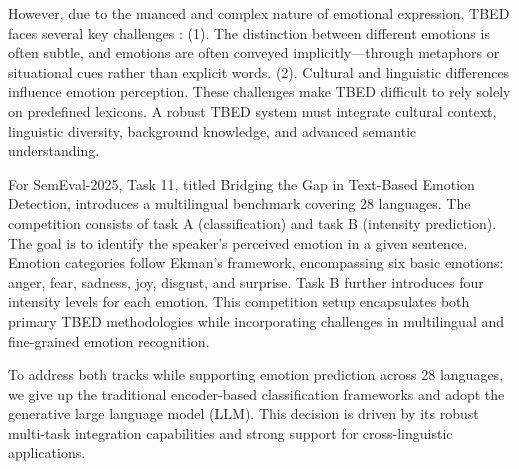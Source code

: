 \documentclass[11pt]{article}
\begin{document}
However, due to the nuanced and complex nature of emotional expression, TBED faces several key challenges \cite{al2024challenges}: (1). The distinction between different emotions is often subtle, and emotions are often conveyed implicitly—through metaphors or situational cues rather than explicit words. (2). Cultural and linguistic differences influence emotion perception. These challenges make TBED difficult to rely solely on predefined lexicons. A robust TBED system must integrate cultural context, linguistic diversity, background knowledge, and advanced semantic understanding.


For SemEval-2025, Task 11, titled Bridging the Gap in Text-Based Emotion Detection, introduces a multilingual benchmark covering 28 languages. The competition consists of task A (classification) and task B (intensity prediction). The goal is to identify the speaker's perceived emotion in a given sentence. Emotion categories follow Ekman's framework\cite{ekman1969repertoire}, encompassing six basic emotions: anger, fear, sadness, joy, disgust, and surprise. Task B further introduces four intensity levels for each emotion. This competition setup encapsulates both primary TBED methodologies while incorporating challenges in multilingual and fine-grained emotion recognition. 


To address both tracks while supporting emotion prediction across 28 languages, we give up the traditional encoder-based classification frameworks and adopt the generative large language model (LLM). This decision is driven by its robust multi-task integration capabilities and strong support for cross-linguistic applications.
\end{document}
